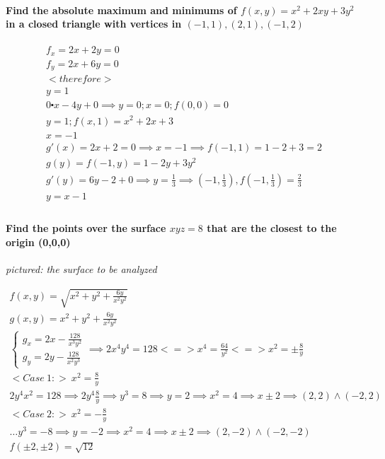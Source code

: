 \documentclass[11pt,fleqn]{book} %
\begin{document}
\paragraph{Find the absolute maximum and minimums of $f(x,y) = x^2+2xy+3y^2$
in a closed triangle with vertices in $(-1,1),(2,1),(-1,2)$}

\begin{gather}
    f_x = 2x+ 2y = 0 \\
    f_y = 2x + 6y = 0 \\
    <therefore> \\
    y = 1 \\
    0 \centerdot x - 4y +0 \implies y = 0; x = 0; f(0,0)=0 \\
    y = 1; f(x,1) = x^2+2x+3 \\
    x = -1\\
    g'(x) = 2x + 2 = 0 \implies x = -1 \implies f(-1,1) = 1-2+3 = 2\\
    g(y) = f(-1,y) = 1 - 2y + 3y^2\\
    g'(y) = 6y-2 + 0 \implies y = \frac{1}{3} \implies (-1, \frac{1}{3}), f(-1, \frac{1}{3}) = \frac{2}{3} \\
    y = x-1 \\
\end{gather}

\paragraph{Find the points over the surface $xyz = 8$
that are the closest to the origin (0,0,0)}
\begin{center}
    \textit{pictured: the surface to be analyzed}
\end{center}

\begin{gather}
    f(x,y) = \sqrt{x^2+y^2+\frac{6y}{x^2 y^2}} \\
    g(x,y) = x^2 + y^2 + \frac{6y}{x^2 y^2} \\
    \begin{cases}
        g_x = 2x - \frac{128}{x^3 y^2} \\
        g_y = 2y - \frac{128}{x^2 y^3}             
    \end{cases} \implies 2x^4 y^4 = 128 < = > x^4 = \frac{64}{y^2} <=> x^2 = \pm \frac{8}{y} \\
    <Case \ 1:> \ x^2 = \frac{8}{y}\\
    2y^4 x^2 = 128 \implies 2y^4 \frac{8}{y} \implies y^3 = 8 \implies y = 2 \implies x^2 = 4 \implies x \pm 2 \implies (2,2) \wedge (-2,2)\\
    <Case \ 2:> \ x^2 = - \frac{8}{y}\\
    \dots y^3 = -8 \implies y = -2 \implies x^2 = 4 \implies x \pm 2 \implies (2,-2) \wedge (-2,-2)\\
    f(\pm 2, \pm 2) = \sqrt{12}
\end{gather}
\end{document}
